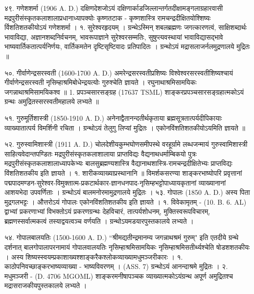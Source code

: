 ४९. गणेशशर्मा (1906 A. D.)
दक्षिणदेशजोऽयं दक्षिणार्काडजिल्लान्तर्गतदीक्षामङ्गलाग्रहारवासी मद्रपुरीसंस्कृतकलाशालाप्रधानाध्यापक्योः कृष्णतटाक - कृष्णशास्त्रि रामचन्द्रदीक्षितयोश्शिष्यः र्विशतिशतकीयोऽयं गणेशशर्मा ।
१. सुरेश्वरहृदयम् । ग्रन्थेऽस्मिन् शबलब्रह्मणः जगत्कारणत्वं, साक्षिशब्दार्थः भावाविद्या, अज्ञानशब्दनिर्वचनम्, भावरूपाज्ञाने सुरेश्वरसम्मतिः, सुषुप्त्यवस्थायां भावाविद्यासद्भावे भाष्यवार्तिकतात्पर्यनिर्णयः, वार्तिकमतेन दृष्टिसृष्टिवादः प्रतिपादितः । ग्रन्थोऽयं मद्रासलाजर्नलमुद्रणालये मुद्रितः ॥

५०. गीर्वाणेन्द्रसरस्वती (1600-1700 A. D.)
अमरेन्द्रसरस्वतीप्रशिष्यः विश्वेश्वरसरस्वतीशिष्यश्चायं गीर्वाणेन्द्रसरस्वती नृसिम्हाश्रमिबोधेन्द्रयत्योः गुरुश्चेति ज्ञायते । रघुनाथाश्रमिसामयिकः जगन्नाथाश्रमिसामयिकश्व ॥
1. प्रपञ्चसारसङ्ग्रह (17637 TSML)
शाङ्करप्रपञ्चसारसङ्ग्रहात्मकोऽयं ग्रन्थः अमुद्रितस्सरस्वतीमहालये लभ्यते ॥

५१. गुरुमूर्तिशास्त्री (1850-1910 A. D.)
अनेनाद्वैतानन्दतीर्थकृताया ब्रह्मसूत्रतात्पर्यदीपिकायाः व्याख्यातात्पर्य विमर्शिनी रचिता । ग्रन्थोऽयं तेलुगु लिप्यां मुद्रितः । एकोनविंशतिशतकीयोऽयमिति ज्ञायते ॥

५२.
गुरुस्वामिशास्त्री (1911 A. D.)
चोलदेशीयकुम्भघोणसमीपस्थे वरहूर्ग्रामे लब्धजन्मायं गुरुस्वामिशास्त्री साहित्यवेदान्तपण्डितः मद्रपुरीसंस्कृतकलाशालाया प्राप्तविद्यः वैद्यनाथधर्माम्बिकयो पुत्रः मद्रपुरीसंस्कृतकलाशालाध्यापकेभ्यः बालसुब्रह्मण्यशास्त्रि वैद्यानाथशास्त्रि-रामचन्द्रदीक्षितेभ्यः प्राप्तविद्यः विंशतिशतकीय इति ज्ञायते ।
१. शारीकव्याख्याप्रस्थानानि ॥
विमर्शकसरण्या शाङ्करभाष्योपरि प्रवृत्तानां पद्मपादमण्डन-सुरेश्वर-विमुक्तात्म-प्रकटार्थकार-ज्ञानधनपाद-नृसिम्हभट्टोपाध्यायकृतानां व्याख्यानानां आशयभेदा उपवर्णिताः । ग्रन्थोऽयं बालमनोरमामुद्रणालये मुद्रितः ।
५३. गोपालः (1850 A. D.)
अस्य पिता मुद्रगलभट्टः । औत्तरोऽयं गोपालः एकोनविंशतिशतकीय इति ज्ञायते ।
१. विवेकामृतम् - (10. B. 6. AL) द्वाभ्यां प्रकरणाभ्यां विभक्तोऽयं प्रकरणग्रन्थः देहविचारं, तात्पर्यशोधनम्, मुक्तिस्वरूपविचारम्, ब्रह्मणस्सर्वात्मकत्वं तस्याद्वयत्वञ्च वर्णयति । ग्रन्थोऽयमडयारपुस्तकालये लभ्यते ।

५४. गोपालबालयतिः (1500-1600 A. D.)
``श्रीमद्यतीन्द्रमानम्य जगन्नाथश्रमं गुरुम्" इति एतदीये ग्रन्थे दर्शनात् बालगोपालापरनामायं गोपालवालयतिः नृसिम्हाश्रमिसामयिकः नृसिम्हाश्रमिसतीर्थ्यश्चेति षोडशशतकीयः । अस्य शिष्यस्स्वयम्प्रकाशाख्यश्शाङ्करैकश्लोकव्याख्यामधुमञ्जरीकारः ।
१. काठोपनिवच्छाङ्करभाष्यव्याख्या - भाष्यविवरणम् । (ASS. 7) ग्रन्थोऽयं आनन्दाश्रमे मुद्रितः ।
२. मधुमञ्जरी - (D. 4706 MGOML) शाङ्करमनीषापञ्चक व्याख्यात्मकोऽयंग्रन्थ अपूर्ण अमुद्रितश्च मद्रासराजकीयपुस्तकालये लभ्यते । 

